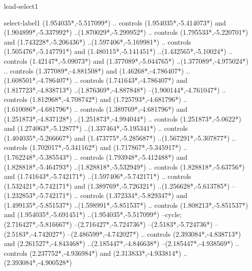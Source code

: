 {\begin{scope}[x=1mm,y=1mm,line width=\SCstroke mm,line cap=round,line join=round]
\begin{SCpart}{lead-select1}
\end{SCpart}
\begin{SCpart}{select-label1}
 ({1.954035*\SCF},{-5.517099*\SCF})
.. controls ({1.954035*\SCF},{-5.414073*\SCF}) and ({1.904899*\SCF},{-5.337992*\SCF}) ..({1.870029*\SCF},{-5.299952*\SCF})
.. controls ({1.795533*\SCF},{-5.220701*\SCF}) and ({1.743228*\SCF},{-5.206436*\SCF}) ..({1.597406*\SCF},{-5.169981*\SCF})
.. controls ({1.505476*\SCF},{-5.147791*\SCF}) and ({1.480115*\SCF},{-5.141451*\SCF}) ..({1.432565*\SCF},{-5.10024*\SCF})
.. controls ({1.42147*\SCF},{-5.09073*\SCF}) and ({1.377089*\SCF},{-5.044765*\SCF}) ..({1.377089*\SCF},{-4.975024*\SCF})
.. controls ({1.377089*\SCF},{-4.881508*\SCF}) and ({1.46268*\SCF},{-4.786407*\SCF}) ..({1.608501*\SCF},{-4.786407*\SCF})
.. controls ({1.741643*\SCF},{-4.786407*\SCF}) and ({1.817723*\SCF},{-4.838713*\SCF}) ..({1.876369*\SCF},{-4.887848*\SCF})
--({1.900144*\SCF},{-4.761047*\SCF})
.. controls ({1.812968*\SCF},{-4.708742*\SCF}) and ({1.725793*\SCF},{-4.681796*\SCF}) ..({1.610086*\SCF},{-4.681796*\SCF})
.. controls ({1.389769*\SCF},{-4.681796*\SCF}) and ({1.251873*\SCF},{-4.837128*\SCF}) ..({1.251873*\SCF},{-4.994044*\SCF})
.. controls ({1.251873*\SCF},{-5.0622*\SCF}) and ({1.274063*\SCF},{-5.12877*\SCF}) ..({1.337464*\SCF},{-5.195341*\SCF})
.. controls ({1.404035*\SCF},{-5.266667*\SCF}) and ({1.473775*\SCF},{-5.285687*\SCF}) ..({1.567291*\SCF},{-5.307877*\SCF})
.. controls ({1.702017*\SCF},{-5.341162*\SCF}) and ({1.717867*\SCF},{-5.345917*\SCF}) ..({1.762248*\SCF},{-5.385543*\SCF})
.. controls ({1.793948*\SCF},{-5.412488*\SCF}) and ({1.828818*\SCF},{-5.464793*\SCF}) ..({1.828818*\SCF},{-5.532949*\SCF})
.. controls ({1.828818*\SCF},{-5.63756*\SCF}) and ({1.741643*\SCF},{-5.742171*\SCF}) ..({1.597406*\SCF},{-5.742171*\SCF})
.. controls ({1.532421*\SCF},{-5.742171*\SCF}) and ({1.389769*\SCF},{-5.726321*\SCF}) ..({1.256628*\SCF},{-5.613785*\SCF})
--({1.232853*\SCF},{-5.742171*\SCF})
.. controls ({1.372334*\SCF},{-5.829347*\SCF}) and ({1.499135*\SCF},{-5.851537*\SCF}) ..({1.598991*\SCF},{-5.851537*\SCF})
.. controls ({1.808213*\SCF},{-5.851537*\SCF}) and ({1.954035*\SCF},{-5.691451*\SCF}) ..({1.954035*\SCF},{-5.517099*\SCF})
--cycle;
 ({2.716427*\SCF},{-5.816667*\SCF})
--({2.716427*\SCF},{-5.724736*\SCF})
--({2.5183*\SCF},{-5.724736*\SCF})
--({2.5183*\SCF},{-4.742027*\SCF})
--({2.486599*\SCF},{-4.742027*\SCF})
.. controls ({2.393084*\SCF},{-4.838713*\SCF}) and ({2.261527*\SCF},{-4.843468*\SCF}) ..({2.185447*\SCF},{-4.846638*\SCF})
--({2.185447*\SCF},{-4.938569*\SCF})
.. controls ({2.237752*\SCF},{-4.936984*\SCF}) and ({2.313833*\SCF},{-4.933814*\SCF}) ..({2.393084*\SCF},{-4.900528*\SCF})

\end{SCpart}
\end{scope}}
